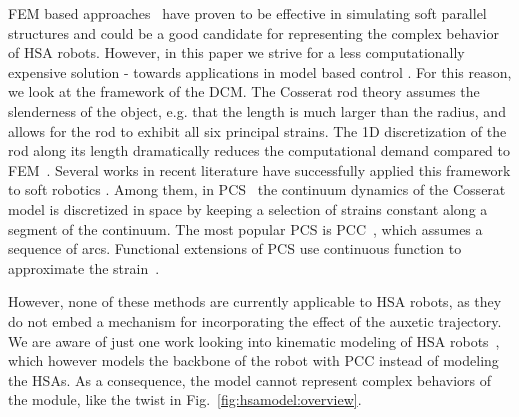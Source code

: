 \gls{FEM} based approaches~\cite{farrell2020extension} have proven to be effective in simulating soft parallel structures \cite{vanneste2021enabling} and could be a good candidate for representing the complex behavior of \gls{HSA} robots. However, in this paper we strive for a less computationally expensive solution - towards applications in model based control \cite{della2023model}. For this reason, we look at the framework of the \gls{DCM}. The Cosserat rod theory assumes the slenderness of the object, e.g. that the length is much larger than the radius, and allows for the rod to exhibit all six principal strains. The 1D discretization of the rod along its length dramatically reduces the computational demand compared to \gls{FEM}~\cite{gazzola2018forward}. 
%
Several works in recent literature have successfully applied this framework to soft robotics \cite{grazioso2019geometrically,sadati2021tmtdyn,armanini2021soft}. Among them, in \gls{PCS}~\cite{renda2018discrete} the continuum dynamics of the Cosserat model is discretized in space by keeping a selection of strains constant along a segment of the continuum. %
The most popular \gls{PCS} is \gls{PCC}~\cite{webster2010design}, which assumes a sequence of arcs. Functional extensions of \gls{PCS} use continuous function to approximate the strain~\cite{della2019control,renda2020geometric}. %

However, none of these methods are currently applicable to HSA robots, as they do not embed a mechanism for incorporating the effect of the auxetic trajectory.
%
We are aware of just one work looking into kinematic modeling of HSA robots~\cite{garg2022kinematic}, which however models the backbone of the robot with \gls{PCC} instead of modeling the HSAs. As a consequence, the model cannot represent complex behaviors of the module, like the twist in Fig.~\ref{fig:hsamodel:overview}. 

